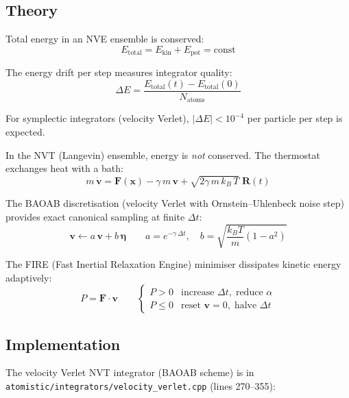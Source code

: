 \documentclass[11pt,a4paper]{article}
\begin{document}
\subsection{Theory}

Total energy in an NVE ensemble is conserved:
\begin{equation}
  E_{\text{total}} = E_{\text{kin}} + E_{\text{pot}} = \text{const}
  \label{eq:nve}
\end{equation}

The energy drift per step measures integrator quality:
\begin{equation}
  \Delta E = \frac{E_{\text{total}}(t) - E_{\text{total}}(0)}{N_{\text{atoms}}}
  \label{eq:edrift}
\end{equation}

For symplectic integrators (velocity Verlet), $|\Delta E| < 10^{-4}$
per particle per step is expected.

In the NVT (Langevin) ensemble, energy is \emph{not} conserved.
The thermostat exchanges heat with a bath:
\begin{equation}
  m\,\dot{\bm{v}} = \bm{F}(\bm{x}) - \gamma\,m\,\bm{v}
  + \sqrt{2\gamma\,m\,k_{B}\,T}\;\bm{R}(t)
  \label{eq:langevin}
\end{equation}

The BAOAB discretisation (velocity Verlet with Ornstein--Uhlenbeck noise
step) provides exact canonical sampling at finite $\Delta t$:
\begin{equation}
  \bm{v} \leftarrow a\,\bm{v} + b\,\bm{\eta}
  \qquad
  a = e^{-\gamma\,\Delta t},\quad
  b = \sqrt{\frac{k_{B}T}{m}(1 - a^{2})}
  \label{eq:baoab}
\end{equation}

The FIRE (Fast Inertial Relaxation Engine) minimiser dissipates kinetic
energy adaptively:
\begin{equation}
  P = \bm{F}\cdot\bm{v}
  \qquad
  \begin{cases}
    P > 0 & \text{increase }\Delta t,\; \text{reduce }\alpha \\
    P \leq 0 & \text{reset }\bm{v}=0,\; \text{halve }\Delta t
  \end{cases}
  \label{eq:fire}
\end{equation}

\subsection{Implementation}

The velocity Verlet NVT integrator (BAOAB scheme) is in
\texttt{atomistic/integrators/velocity\_verlet.cpp} (lines 270--355):
\end{document}
